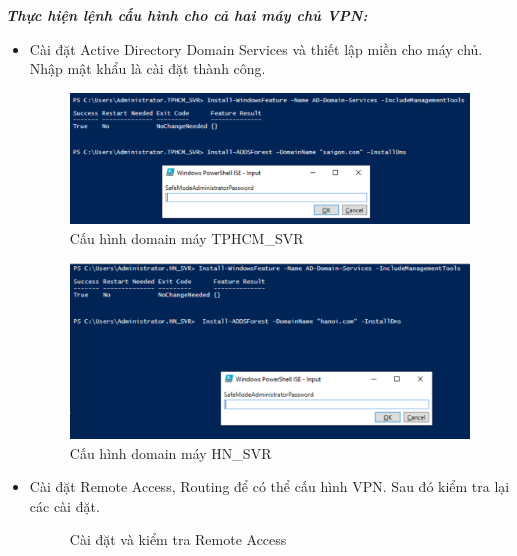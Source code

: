 \textbf{\textit{Thực hiện lệnh cấu hình cho cả hai máy chủ VPN:}} 
\begin{itemize}
    \item Cài đặt Active Directory Domain Services và thiết lập miền cho máy chủ. Nhập mật khẩu là cài đặt thành công.
   \begin{figure}[htbp]
        \centering
        \includegraphics[width=0.7\linewidth]{SiteToSiteImg/domainHCM.png}
        \caption{Cấu hình domain máy TPHCM\_SVR}
    \end{figure}
     \newpage
     \begin{figure}[htbp]
     \centering
        \includegraphics[width=0.7\linewidth]{SiteToSiteImg/domainHN.png}
        \caption{Cấu hình domain máy HN\_SVR}
    \end{figure}
    \item Cài đặt Remote Access, Routing để có thể cấu hình VPN. Sau đó kiểm tra lại các cài đặt.
    \begin{figure}[htbp]
            \hfill
            \hfill
            \caption{Cài đặt và kiểm tra Remote Access}
        \end{figure}
        

\end{itemize}
